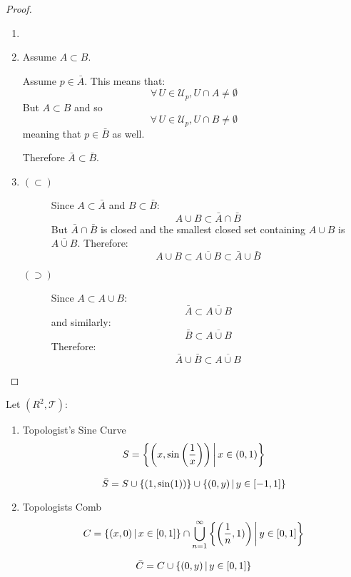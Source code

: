 \documentclass[letterpaper,12pt,fleqn]{article}
\newcommand{\T}{\mathscr{T}}
\newcommand{\U}{\mathcal{U}}
\begin{document}
\begin{proof}
  \begin{enumerate}
  \item[]
  \item Assume \(A\subset B\).

    Assume \(p\in\bar{A}\).  This means that:
    \[\forall\,U\in\U_p,U\cap A\ne\emptyset\]
    But \(A\subset B\) and so
    \[\forall\,U\in\U_p,U\cap B\ne\emptyset\]
    meaning that \(p\in\bar{B}\) as well.

    Therefore \(\bar{A}\subset\bar{B}\).

  \item
    \begin{description}
    \item[\((\subset)\)] Since \(A\subset\bar{A}\) and \(B\subset\bar{B}\):
      \[A\cup B\subset\bar{A}\cap\bar{B}\]
      But \(\bar{A}\cap\bar{B}\) is closed and the smallest closed set containing \(A\cup B\) is
      \(\overline{A\cup B}\).  Therefore:
      \[A\cup B\subset\overline{A\cup B}\subset\bar{A}\cup\bar{B}\]
    \item[\((\supset)\)] Since \(A\subset A\cup B\):
      \[\bar{A}\subset\overline{A\cup B}\]
      and similarly:
      \[\bar{B}\subset\overline{A\cup B}\]
      Therefore:
      \[\bar{A}\cup\bar{B}\subset\overline{A\cup B}\]
    \end{description}
  \end{enumerate}
\end{proof}

\begin{example}[Exercise 2.24]
  Let \((R^2,\T)\):

  \begin{enumerate}
    \item Topologist's Sine Curve
      \[S=\left\{{\left(x,\sin\left(\frac{1}{x}\right)\right)}\,\middle|\,{x\in(0,1)}\right\}\]

      \[\bar{S}=S\cup\{(1,\sin(1))\}\cup\left\{{(0,y)}\,\middle|\,{y\in[-1,1]}\right\}\]

    \item Topologists Comb
      \[C=\left\{{(x,0)}\,\middle|\,{x\in[0,1]}\right\}\cap\bigcup_{n=1}^{\infty}\left\{{\left(\frac{1}{n},1)\right)}\,\middle|\,{y\in[0,1]}\right\}\]

      \[\bar{C}=C\cup\left\{{(0,y)}\,\middle|\,{y\in[0,1]}\right\}\]
  \end{enumerate}
\end{example}
\end{document}
